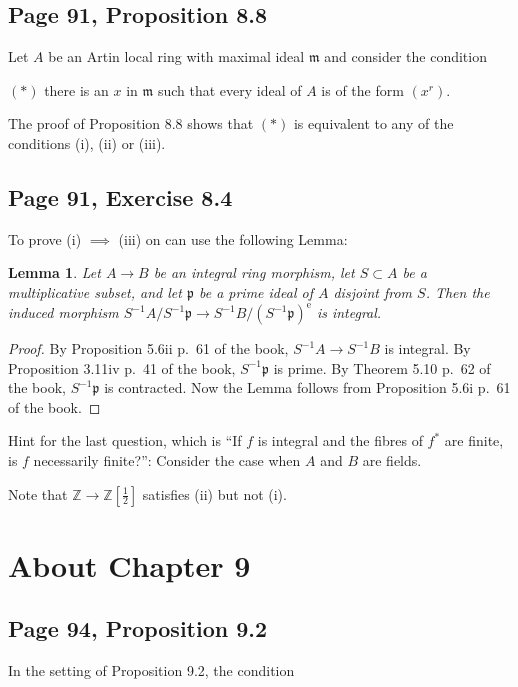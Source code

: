 \documentclass[parskip=half,fontsize=12pt]{scrartcl}%
\newcommand{\oo}{\operatorname}\newcommand{\ooo}{\operatorname*}
\newcommand{\mf}{\mathfrak}
\newcommand{\mmm}{\mf m}
\newcommand{\ppp}{\mf p}
\newtheorem{lem}[thm]{Lemma}
\begin{document}
\subsection{Page 91, Proposition 8.8}\label{88}%

Let $A$ be an Artin local ring with maximal ideal $\mmm$ and consider the condition

$(*)$ there is an $x$ in $\mmm$ such that every ideal of $A$ is of the form $(x^r)$. 

The proof of Proposition 8.8 shows that $(*)$ is equivalent to any of the conditions (i), (ii) or (iii). 

\subsection{Page 91, Exercise 8.4}%

To prove (i) $\implies$ (iii) on can use the following Lemma:

\begin{lem}
Let $A\to B$ be an integral ring morphism, let $S\subset A$ be a multiplicative subset, and let $\ppp$ be a prime ideal of $A$ disjoint from $S$. Then the induced morphism $S^{-1}A/S^{-1}\ppp\to S^{-1}B/(S^{-1}\ppp)^{\oo e}$ is integral.
\end{lem} 
 
\begin{proof}
By Proposition 5.6ii p.~61 of the book, $S^{-1}A\to S^{-1}B$ is integral. By Proposition 3.11iv p.~41 of the book, $S^{-1}\ppp$ is prime. By Theorem 5.10 p.~62 of the book, $S^{-1}\ppp$ is contracted. Now the Lemma follows from Proposition 5.6i p.~61 of the book.
\end{proof}

Hint for the last question, which is ``If $f$ is integral and the fibres of $f^*$ are finite, is $f$ necessarily finite?'': Consider the case when $A$ and $B$ are fields. 

Note that $\mathbb Z\to\mathbb Z[\frac12]$ satisfies (ii) but not (i). 

\section{About Chapter 9}%

\subsection{Page 94, Proposition 9.2}\label{92}%

In the setting of Proposition 9.2, the condition
\end{document}
